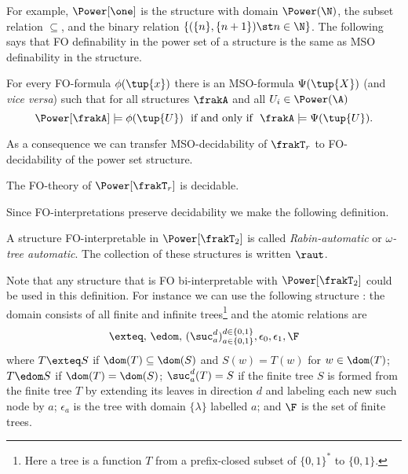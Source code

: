 For example, $\Power[\one]$ is the structure with domain $\Power(\N)$, the subset relation $\subseteq$, and the binary relation $\{(\{n\},\{n+1\}) \st n \in \N\}$.
The following says that FO definability in the power set of a structure is the same as MSO definability in the structure.

\begin{proposition} \label{AS:prop:translation}
For every FO-formula $\phi(\tup{x})$ there is an MSO-formula $\Psi(\tup{X})$ (and {\it vice versa}) such that for all structures $\frakA$ and all $U_i \in \Power({\A})$
\[
\Power[\frakA] \models \phi(\tup{U}) \ \mbox{ if and only if } \  \frakA \models \Psi(\tup{U}) .
\]
\end{proposition}

As a consequence we can transfer MSO-decidability of $\frakT_r$ to FO-decidability of the power set structure.
\begin{corollary}
The FO-theory of $\Power[\frakT_r]$ is decidable.
\end{corollary}

Since FO-interpretations preserve decidability we make the following definition.

\begin{definition} \label{AS:dfn:raut} \cite{Blum99}
A structure FO-interpretable in $\Power[\frakT_2]$ is called 
{\em Rabin-automatic} or {\em $\omega$-tree automatic}. The collection of these structures is written $\raut$.
\end{definition}

Note that any structure that is FO bi-interpretable with $\Power[\frakT_2]$ could be used in this definition. For instance we can use the following structure \cite{Blum99}:
%
the domain consists of all finite and infinite trees\footnote{Here a tree is a function $T$ from a prefix-closed subset of $\{0,1\}^\ast$ to $\{0,1\}$.}  and the atomic relations are
 \[
       \exteq, \, \edom,\,  (\suc_a^d)_{a \in \{0,1\}}^{d \in \{0,1\}},  \epsilon_0, \epsilon_1, \F 
 \]
where  $T \exteq S$ if $\dom(T) \subseteq \dom(S)$
and $S(w) = T(w)$ for $w \in \dom(T)$; $T \edom S$ if $\dom(T) = \dom(S)$;  $\suc_a^d(T) = S$ if the finite tree $S$ is formed from the finite tree $T$ by extending its leaves in direction $d$
and labeling each new such node by $a$; $\epsilon_a$ is the tree with domain $\{\lambda\}$ labelled $a$; and $\F$ is the set of finite trees.
 
